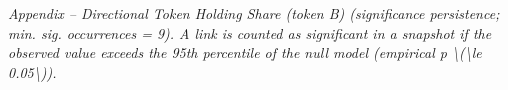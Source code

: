 \begin{table}[!ht]
\centering
\small
{}
\vspace{2mm}\textit{Appendix – Directional Token Holding Share (token B) (significance persistence; min. sig. occurrences = 9). A link is counted as significant in a snapshot if the observed value exceeds the 95th percentile of the null model (empirical p \textbackslash{}(\textbackslash{}le 0.05\textbackslash{})).}
\end{table}